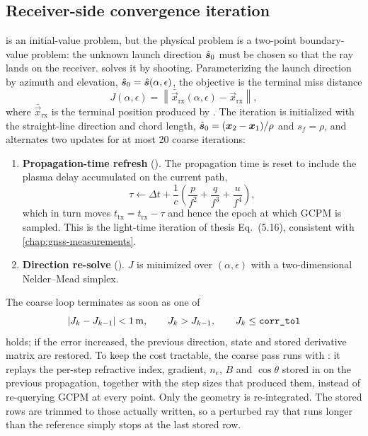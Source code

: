 \subsection{Receiver-side convergence iteration}
\label{sec:iono-correction}

 is an initial-value problem, but the physical problem is a
two-point boundary-value problem: the unknown launch direction $\hat{\bm{s}}_0$ must
be chosen so that the ray lands on the receiver.  \lupnt{} solves it by shooting.
Parameterizing the launch direction by azimuth and elevation,
$\hat{\bm{s}}_0 = \hat{\bm{s}}(\alpha, \epsilon)$, the objective is the terminal miss
distance
%
\begin{equation}
  \label{eq:iono-miss}
  J(\alpha,\epsilon)
  = \left\lVert \bar{\vec{x}}_\mathrm{rx}(\alpha,\epsilon) - \vec{x}_\mathrm{rx} \right\rVert ,
\end{equation}
%
where $\bar{\vec{x}}_\mathrm{rx}$ is the terminal position produced by
.  The iteration is initialized with the straight-line
direction and chord length,
$\hat{\bm{s}}_0 = (\bm{x}_2 - \bm{x}_1)/\rho$ and $s_f = \rho$, and alternates two
updates for at most 20 coarse iterations:

\begin{enumerate}[nosep]
  \item \textbf{Propagation-time refresh} ().  The
        propagation time is reset to include the plasma delay accumulated on the
        current path,
        \begin{equation}
          \label{eq:iono-proptime}
          \tau \leftarrow \Delta t
            + \frac{1}{c}\left(\frac{p}{f^2} + \frac{q}{f^3} + \frac{u}{f^4}\right) ,
        \end{equation}
        which in turn moves $t_\mathrm{tx} = t_\mathrm{rx} - \tau$ and hence the
        epoch at which GCPM is sampled.  This is the light-time iteration of
        thesis Eq.~(5.16), consistent with \cref{chap:gnss-measurements}.
  \item \textbf{Direction re-solve} ().  $J$ is
        minimized over $(\alpha, \epsilon)$ with a two-dimensional Nelder--Mead
        simplex.
\end{enumerate}

The coarse loop terminates as soon as one of
%
\begin{equation}
  \left|J_k - J_{k-1}\right| < \SI{1}{\meter},
  \qquad
  J_k > J_{k-1},
  \qquad
  J_k \le \texttt{corr\_tol}
\end{equation}
%
holds; if the error increased, the previous direction, state and stored
derivative matrix are restored.  To keep the cost tractable, the coarse pass
runs with : it replays the per-step
refractive index, gradient, $n_e$, $B$ and $\cos\theta$ stored in
 on the previous propagation, together with the step sizes that
produced them, instead of re-querying GCPM at every point.  Only the geometry is
re-integrated.  The stored rows are trimmed to those actually written, so a
perturbed ray that runs longer than the reference simply stops at the last stored
row.

